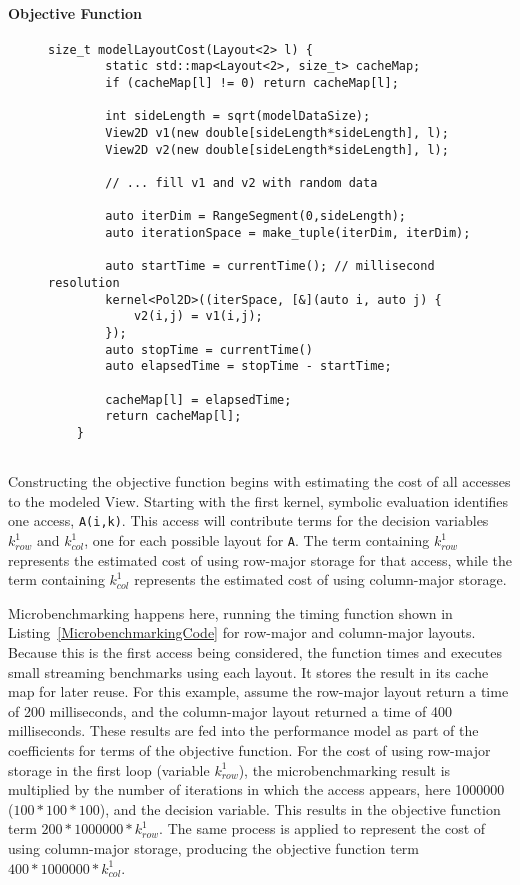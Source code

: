 \paragraph{Objective Function}

\begin{figure}
	\begin{lstlisting}[caption={Microbenchmarking function for determining objective function cost coefficients. Code is shown for two-dimensional case for clarity. Note that the size of the data in the timed kernel does not change based on the size of the loops being modeled.},label=MicrobenchmarkingCode]
	size_t modelLayoutCost(Layout<2> l) {
		static std::map<Layout<2>, size_t> cacheMap;
		if (cacheMap[l] != 0) return cacheMap[l];

		int sideLength = sqrt(modelDataSize);
		View2D v1(new double[sideLength*sideLength], l);
		View2D v2(new double[sideLength*sideLength], l);

		// ... fill v1 and v2 with random data

		auto iterDim = RangeSegment(0,sideLength);
		auto iterationSpace = make_tuple(iterDim, iterDim);

		auto startTime = currentTime(); // millisecond resolution
		kernel<Pol2D>((iterSpace, [&](auto i, auto j) {
			v2(i,j) = v1(i,j);
		});
		auto stopTime = currentTime()
		auto elapsedTime = stopTime - startTime;

		cacheMap[l] = elapsedTime;
		return cacheMap[l];
	}
	
	\end{lstlisting}
\end{figure}
Constructing the objective function begins with estimating the cost of all accesses to the modeled View.
Starting with the first kernel, symbolic evaluation identifies one access, \verb.A(i,k)..
This access will contribute terms for the decision variables $k_{row}^1$ and $k_{col}^1$, one for each possible layout for \verb.A..
The term containing $k_{row}^1$ represents the estimated cost of using row-major storage for that access, while the term containing $k_{col}^1$ represents the estimated cost of using column-major storage.

Microbenchmarking happens here, running the timing function shown in Listing~\ref{MicrobenchmarkingCode} for row-major and column-major layouts.
Because this is the first access being considered, the function times and executes small streaming benchmarks using each layout. 
It stores the result in its cache map for later reuse.
For this example, assume the row-major layout return a time of 200 milliseconds, and the column-major layout returned a time of 400 milliseconds.
These results are fed into the performance model as part of the coefficients for terms of the objective function. 
For the cost of using row-major storage in the first loop (variable $k_{row}^1$), the microbenchmarking result is multiplied by the number of iterations in which the access appears, here 1000000 ($100*100*100$), and the decision variable.
This results in the objective function term $200 * 1000000 * k_{row}^1$. 
The same process is applied to represent the cost of using column-major storage, producing the objective function term $400 * 1000000 * k_{col}^1$.

